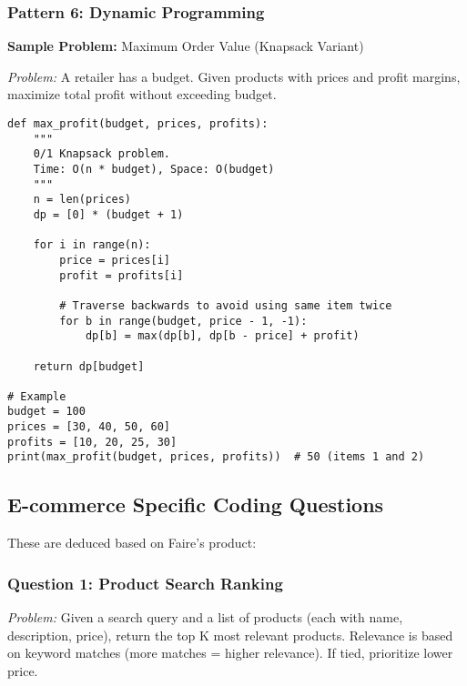\documentclass[11pt,letterpaper]{article}
\begin{document}
\subsubsection{Pattern 6: Dynamic Programming}

\textbf{Sample Problem:} Maximum Order Value (Knapsack Variant)

\textit{Problem:} A retailer has a budget. Given products with prices and profit margins, maximize total profit without exceeding budget.

\begin{lstlisting}
def max_profit(budget, prices, profits):
    """
    0/1 Knapsack problem.
    Time: O(n * budget), Space: O(budget)
    """
    n = len(prices)
    dp = [0] * (budget + 1)

    for i in range(n):
        price = prices[i]
        profit = profits[i]

        # Traverse backwards to avoid using same item twice
        for b in range(budget, price - 1, -1):
            dp[b] = max(dp[b], dp[b - price] + profit)

    return dp[budget]

# Example
budget = 100
prices = [30, 40, 50, 60]
profits = [10, 20, 25, 30]
print(max_profit(budget, prices, profits))  # 50 (items 1 and 2)
\end{lstlisting}

\subsection{E-commerce Specific Coding Questions}

These are deduced based on Faire's product:

\subsubsection{Question 1: Product Search Ranking}

\textit{Problem:} Given a search query and a list of products (each with name, description, price), return the top K most relevant products. Relevance is based on keyword matches (more matches = higher relevance). If tied, prioritize lower price.
\end{document}
